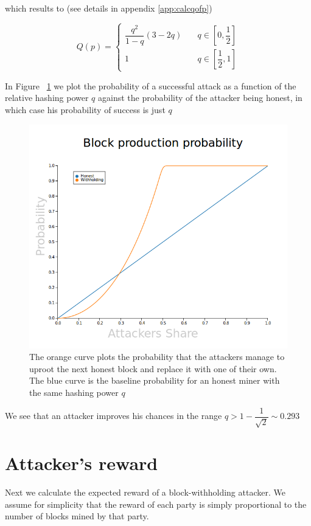 \documentclass[letterpaper,12pt]{report}
\theoremstyle{plain}
\theoremstyle{definition}
\begin{document}
which results to (see details in appendix \ref{app:calcqofp})

\begin{equation}\label{eq:qofp}
\mathit{Q}(p)=
\begin{cases}
\dfrac{q^2}{1-q}\left(
3-2q
\right) & \quad q \in [0,\dfrac{1}{2}] \\
1 & \quad q \in [\dfrac{1}{2},1] 
\end{cases}
\end{equation}


In Figure ~\ref{fig:PlotProbOfSuccess} we plot the probability of a successful attack as a function of the relative hashing power $q$ against the probability of the attacker being honest, in which case his probability of success is just $q$

\begin{figure}[pos]
\centering
\includegraphics[width=150mm]{blocksurvival.png}
\caption{The orange curve plots the probability that the attackers manage to uproot the next honest block and replace it with one of their own. The blue curve is the baseline probability for an honest miner with the same hashing power $q$}
\label{fig:PlotProbOfSuccess}
\end{figure}

We see that an attacker improves his chances in the range $q>1-\dfrac{1}{\sqrt{2}} \sim 0.293$
\newpage
\section{Attacker's reward}
Next we calculate the expected reward of a block-withholding attacker.
We assume for simplicity that the reward of each party is simply proportional to the number of blocks mined by that party.
\end{document}

